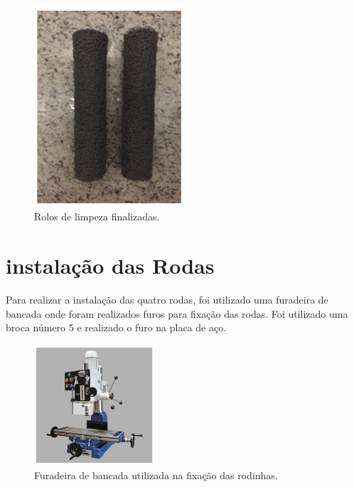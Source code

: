 \par
\begin{figure}[h]
  \centering
  \includegraphics[width=0.5\textwidth]{figures/rolo-fim.png}
  \caption{Rolos de limpeza finalizadas.}
  \label{fig:rolo-fim}
\end{figure}
\FloatBarrier
\par

\section{instalação das Rodas}
Para realizar a instalação das quatro rodas, foi utilizado uma furadeira de bancada onde foram realizados furos para fixação das rodas. Foi utilizado uma broca número 5 e realizado o furo na placa de aço.

\par
\begin{figure}[h]
  \centering
  \includegraphics[width=0.4\textwidth]{figures/furadeira.png}
  \caption{Furadeira de bancada utilizada na fixação das rodinhas.}
  \label{fig:furadeira}
\end{figure}
\FloatBarrier
\par

